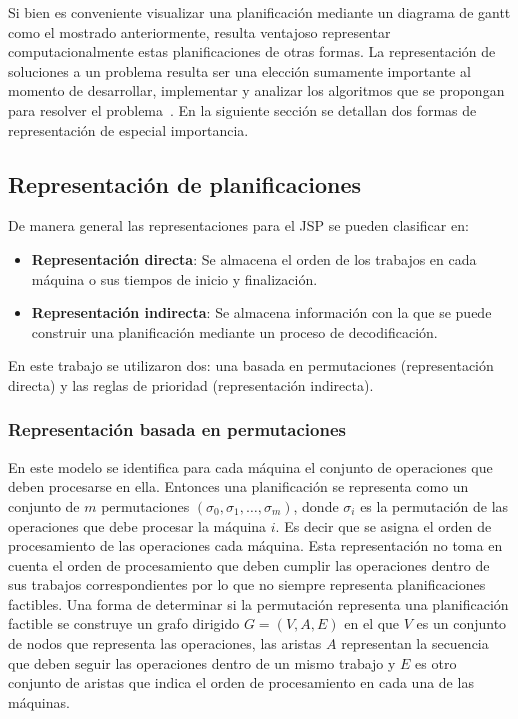Si bien es conveniente visualizar una planificación mediante un diagrama de gantt como el mostrado anteriormente, resulta ventajoso representar computacionalmente 
estas planificaciones de otras formas. 
%
La representación de soluciones a un problema resulta ser una elección sumamente importante al momento de desarrollar, implementar y analizar los algoritmos que se 
propongan para resolver el problema~\cite{rothlauf2002representations}. 
%
En la siguiente sección se detallan dos formas de representación de especial importancia.

\subsection{Representación de planificaciones}
De manera general las representaciones para el JSP se pueden clasificar en\cite{Cheng1996}:
\begin{itemize}
    \item \textbf{Representación directa}: Se almacena el orden de los trabajos en cada máquina o sus tiempos de inicio y finalización.
    \item \textbf{Representación indirecta}: Se almacena información con la que se puede construir una planificación mediante un proceso de decodificación.
\end{itemize}

En este trabajo se utilizaron dos: una basada en permutaciones (representación directa) y las reglas de prioridad (representación indirecta).

\subsubsection*{Representación basada en permutaciones} 
En este modelo se identifica para cada máquina el conjunto de operaciones que deben procesarse en ella. Entonces una planificación se representa como un conjunto de $m$ permutaciones $(\sigma_0,\sigma_1,\dots,\sigma_m)$, donde $\sigma_i$ es la permutación de las operaciones que debe procesar la máquina $i$. Es decir que se asigna el orden de procesamiento de las operaciones cada máquina.
%
Esta representación no toma en cuenta el orden de procesamiento que deben cumplir las operaciones dentro de sus trabajos correspondientes por lo que no siempre representa planificaciones factibles.
%
Una forma de determinar si la permutación representa una planificación factible se construye un grafo dirigido $G=(V,A,E)$ en el que $V$ es un conjunto de nodos que representa las operaciones, las aristas $A$ representan la secuencia que deben seguir las operaciones dentro de un mismo trabajo y $E$ es otro conjunto de aristas que indica el orden de procesamiento en cada una de las máquinas. 

